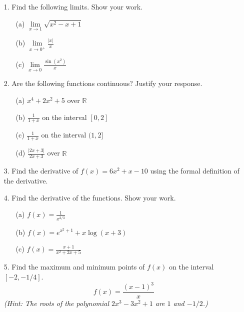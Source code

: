\documentclass[12pt, amssymb, one column]{article}
\begin{document}
\begin{itemize}
	\item[1.] Find the following limits. Show your work.
		\begin{itemize}
			\item[(a)]$\lim\limits_{x\to1}\sqrt{x^2-x+1}$
			\item[(b)]$\lim\limits_{x\to 0^+}\frac{|x|}{x}$
			\item[(c)]$\lim\limits_{x\to 0}\frac{\sin(x^2)}{x}$
		\end{itemize}

	\item[2.] Are the following functions continuous? Justify your response.
		\begin{itemize}
			\item[(a)] $x^4+2x^2+5$ over $\mathbb{R}$
			\item[(b)] $\frac{1}{1+x}$ on the interval $[0,2]$
			\item[(c)] $\frac{1}{1+x}$ on the interval $(1,2]$
			\item[(d)] $\frac{|2x+3|}{2x+3}$ over $\mathbb{R}$
		\end{itemize}

	\item[3.] Find the derivative of $f(x)=6x^2+x-10$ using the formal definition of the derivative.

	\item[4.] Find the derivative of the functions. Show your work.
		\begin{itemize}
			\item[(a)]$f(x)=\frac{1}{x^{2/3}}$
			\item[(b)]$f(x) = e^{x^2+1} + x\log(x+3)$
			\item[(c)]$f(x) = \frac{x+1}{x^2+2x+5}$
		\end{itemize}
	
	\item[5.] Find the maximum and minimum points of $f(x)$ on the interval $[-2,-1/4]$.
		$$f(x) = \frac{(x-1)^3}{x}$$
		\textit{(Hint: The roots of the polynomial $2x^3-3x^2+1$ are $1$ and $-1/2$.)}
	
\end{itemize}
\end{document}

